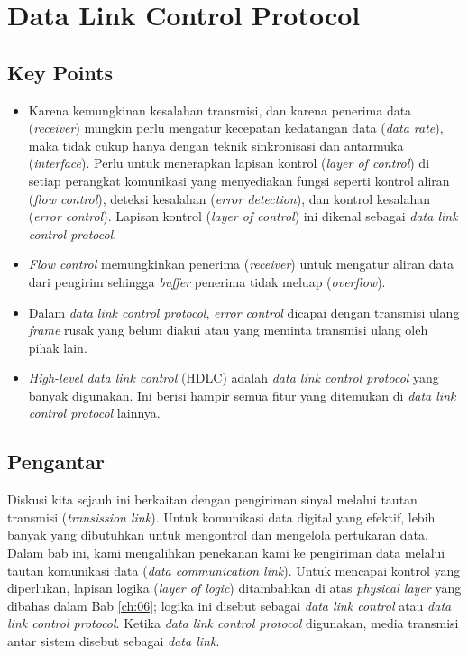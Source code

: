 \chapter{Data Link Control Protocol}


\section{Key Points}

\begin{itemize}
	\item Karena kemungkinan kesalahan transmisi, dan karena penerima data (\textit{receiver}) mungkin perlu mengatur kecepatan kedatangan data (\textit{data rate}), maka tidak cukup hanya dengan teknik sinkronisasi dan antarmuka (\textit{interface}). Perlu untuk menerapkan lapisan kontrol (\textit{layer of control}) di setiap perangkat komunikasi yang menyediakan fungsi seperti kontrol aliran (\textit{flow control}), deteksi kesalahan (\textit{error detection}), dan kontrol kesalahan (\textit{error control}). Lapisan kontrol (\textit{layer of control}) ini dikenal sebagai \textit{data link control protocol}.

	\item \textit{Flow control} memungkinkan penerima (\textit{receiver}) untuk mengatur aliran data dari pengirim sehingga \textit{buffer} penerima tidak meluap (\textit{overflow}).
	
	\item Dalam \textit{data link control protocol}, \textit{error control} dicapai dengan transmisi ulang \textit{frame} rusak yang belum diakui atau yang meminta transmisi ulang oleh pihak lain.
	
	\item \textit{High-level data link control} (HDLC) adalah \textit{data link control protocol} yang banyak digunakan. Ini berisi hampir semua fitur yang ditemukan di \textit{data link control protocol} lainnya.
\end{itemize}


\section{Pengantar}

Diskusi kita sejauh ini berkaitan dengan pengiriman sinyal melalui tautan transmisi (\textit{transission link}). Untuk komunikasi data digital yang efektif, lebih banyak yang dibutuhkan untuk mengontrol dan mengelola pertukaran data. Dalam bab ini, kami mengalihkan penekanan kami ke pengiriman data melalui tautan komunikasi data (\textit{data communication link}). Untuk mencapai kontrol yang diperlukan, lapisan logika (\textit{layer of logic}) ditambahkan di atas \textit{physical layer} yang dibahas dalam Bab \ref{ch:06}; logika ini disebut sebagai \textit{data link control} atau \textit{data link control protocol}. Ketika \textit{data link control protocol} digunakan, media transmisi antar sistem disebut sebagai \textit{data link}.

